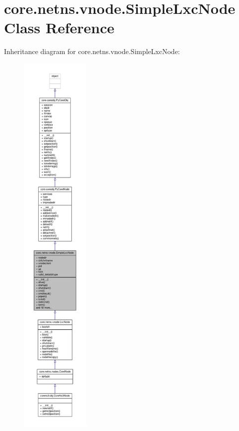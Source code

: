 \hypertarget{classcore_1_1netns_1_1vnode_1_1_simple_lxc_node}{\section{core.\+netns.\+vnode.\+Simple\+Lxc\+Node Class Reference}
\label{classcore_1_1netns_1_1vnode_1_1_simple_lxc_node}
}


Inheritance diagram for core.\+netns.\+vnode.\+Simple\+Lxc\+Node\+:
\nopagebreak
\begin{figure}[H]
\begin{center}
\leavevmode
\includegraphics[height=550pt]{classcore_1_1netns_1_1vnode_1_1_simple_lxc_node__inherit__graph}
\end{center}
\end{figure}


